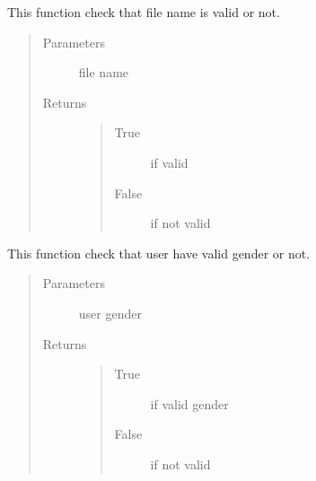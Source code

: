 \documentclass[letterpaper,10pt,english]{sphinxmanual}
\begin{document}

\begin{fulllineitems}
\label{\detokenize{janta:janta.viewhelper.is_file_name}}
This function check that file name is valid or not.
\begin{quote}\begin{description}
\item[{Parameters}] \leavevmode
{} \textendash{} file name

\item[{Returns}] \leavevmode
\begin{quote}\begin{description}
\item[{True}] \leavevmode
if valid

\item[{False}] \leavevmode
if not valid

\end{description}\end{quote}


\end{description}\end{quote}

\end{fulllineitems}


\begin{fulllineitems}
\label{\detokenize{janta:janta.viewhelper.is_gender}}
This function check that user have valid  gender or not.
\begin{quote}\begin{description}
\item[{Parameters}] \leavevmode
{} \textendash{} user gender

\item[{Returns}] \leavevmode
\begin{quote}\begin{description}
\item[{True}] \leavevmode
if valid gender

\item[{False}] \leavevmode
if not valid

\end{description}\end{quote}


\end{description}\end{quote}

\end{fulllineitems}
\end{document}

